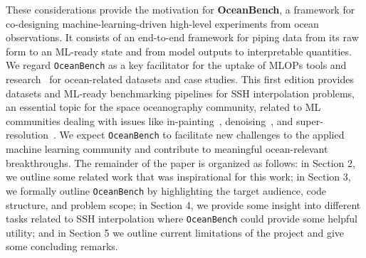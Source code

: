 These considerations provide the motivation for \textbf{OceanBench}, a framework for co-designing machine-learning-driven high-level experiments from ocean observations. 
It consists of an end-to-end framework for piping data from its raw form to an ML-ready state and from model outputs to interpretable quantities. 
We regard \texttt{OceanBench} as a key facilitator for the uptake of MLOPs tools and research~\cite{MLOPS1,MLOPS2} for ocean-related datasets and case studies. This first edition provides datasets and ML-ready benchmarking pipelines for SSH interpolation problems, an essential topic for the space oceanography community, related to ML communities dealing with issues like in-painting~\cite{InPaintingSurvey}, denoising~\cite{DENOISESURVEY,DENOISESURVEY2}, and super-resolution~\cite{SuperResSurvey}. 
We expect \texttt{OceanBench} to facilitate new challenges to the applied machine learning community and contribute to meaningful ocean-relevant breakthroughs.
%
The remainder of the paper is organized as follows: in Section 2, we outline some related work that was inspirational for this work; in Section 3, we formally outline \texttt{OceanBench} by highlighting the target audience, code structure, and problem scope; in Section 4, we provide some insight into different tasks related to SSH interpolation where \texttt{OceanBench} could provide some helpful utility; and in Section 5 we outline current limitations of the project and give some concluding remarks.







